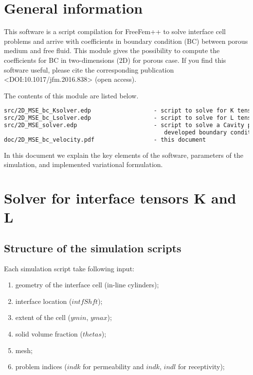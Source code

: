 \documentclass[12pt,a4paper]{article}
\begin{document}
\sloppy

\section{General information}

This software is a script compilation for FreeFem++ to solve interface cell problems and arrive with coefficients in boundary condition (BC) between porous medium and free fluid. This module gives the possibility to compute the coefficients for BC in two-dimensions (2D) for porous case. If you find this software useful, please cite the corresponding publication <DOI:10.1017/jfm.2016.838> (open access).

The contents of this module are listed below.
\begin{lstlisting}[language=tex]
src/2D_MSE_bc_Ksolver.edp                  - script to solve for K tensor
src/2D_MSE_bc_Lsolver.edp                  - script to solve for L tensor
src/2D_MSE_solver.edp                      - script to solve a Cavity problem with
                                              developed boundary conditions
doc/2D_MSE_bc_velocity.pdf                 - this document
\end{lstlisting}

In this document we explain the key elements of the software, parameters of the simulation, and implemented variational formulation.

\section{Solver for interface tensors K and L}

\subsection{Structure of the simulation scripts}

Each simulation script take following input:
\begin{enumerate}
    \item geometry of the interface cell (in-line cylinders);
	\item interface location ($intfShft$);
    \item extent of the cell ($ymin$, $ymax$);
    \item solid volume fraction ($thetas$);
    \item mesh;
    \item problem indices ($indk$ for permeability and $indk$, $indl$ for receptivity);
\end{enumerate}
\end{document}
